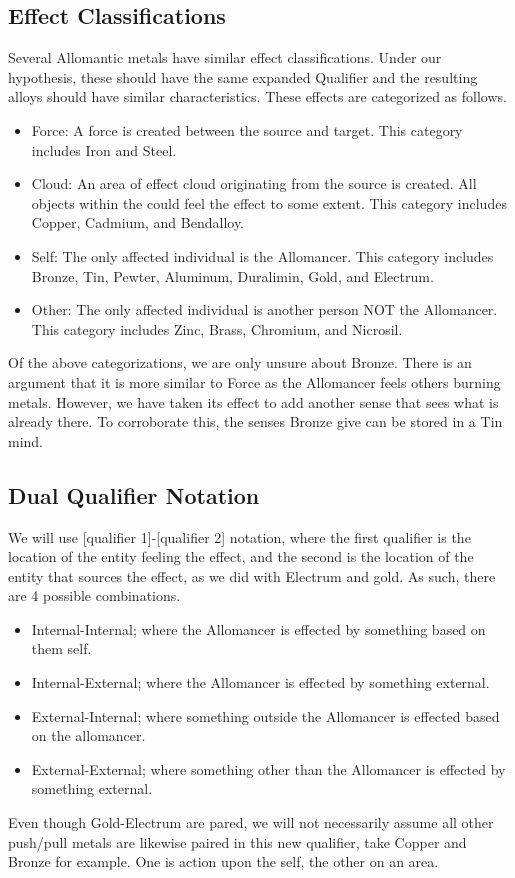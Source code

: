 \documentclass[conference]{IEEEtran}
\begin{document}
\subsection*{Effect Classifications}
Several Allomantic metals have similar effect classifications.  Under our hypothesis, these should have the same expanded Qualifier and the resulting alloys should have similar characteristics.
These effects are categorized as follows.
\begin{itemize}
\item Force: A force is created between the source and target.  This category includes Iron and Steel.

\item Cloud: An area of effect cloud originating from the source is created.  All objects within the could feel the effect to some extent.  This category includes Copper, Cadmium, and Bendalloy.

\item Self: The only affected individual is the Allomancer.  This category includes Bronze, Tin, Pewter, Aluminum, Duralimin, Gold, and Electrum.

\item Other:  The only affected individual is another person NOT the Allomancer.  This category includes Zinc, Brass, Chromium, and Nicrosil.

\end{itemize}

Of the above categorizations, we are only unsure about Bronze.  There is an argument that it is more similar to Force as the Allomancer feels others burning metals.  However, we have taken its effect to add another sense that sees what is already there.  To corroborate this, the senses Bronze give can be stored in a Tin mind.
\subsection*{Dual Qualifier Notation}
We will use [qualifier 1]-[qualifier 2] notation, where the first qualifier is the location of the entity feeling the effect, and the second is the location of the entity that sources the effect, as we did with Electrum and gold.  As such, there are 4 possible combinations.  
\begin{itemize}
\item Internal-Internal; where the Allomancer is effected by something based on them self.
\item Internal-External; where the Allomancer is effected by something external.
\item External-Internal; where something outside the Allomancer is effected based on the allomancer.
\item External-External; where something other than the Allomancer is effected by something external.
\end{itemize}
Even though Gold-Electrum are pared, we will not necessarily assume all other push/pull metals are likewise paired in this new qualifier, take Copper and Bronze for example.  One is action upon the self, the other on an area.  
\end{document}
